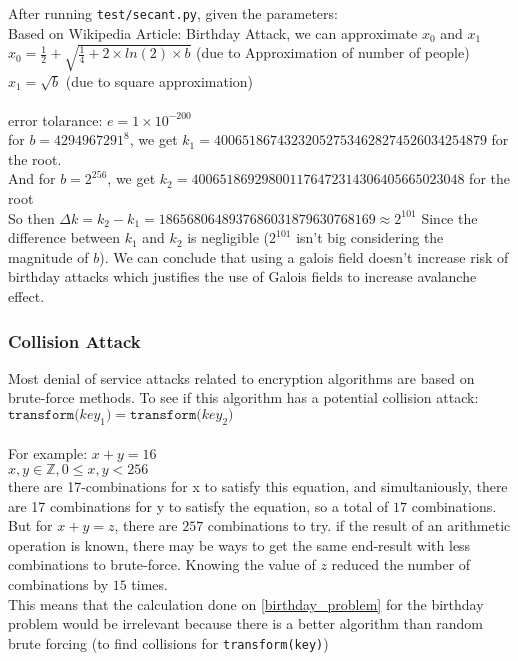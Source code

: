 \documentclass[fleqn, a4paper,12pt]{article}
\begin{document}
After running \texttt{test/secant.py}, given the parameters: \\
Based on Wikipedia Article: Birthday Attack, we can approximate $x_0$ and $x_1$ \\
$x_0 = \frac{1}{2}+\sqrt{\frac{1}{4}+2 \times ln(2) \times b}$ (due to Approximation of number of people) \\
$x_1 = \sqrt{b}$ (due to square approximation) \\
\\ error tolarance:
$e = 1 \times 10^{-200}$ \\
for $b=4294967291^8$,  we get $k_1 = 400651867432320527534628274526034254879$ for the root. \\
And for $b = 2^{256}$, we get $k_2 = 400651869298001176472314306405665023048$ for the root \\
So then $\Delta k = k_2 - k_1 = 1865680648937686031879630768169 \approx 2^{101}$
Since the difference between $k_1$ and $k_2$ is negligible ($2^{101}$ isn't big considering the magnitude of $b$). We can conclude  that using a galois field doesn't increase risk of birthday attacks which justifies the use of Galois fields to increase avalanche effect.


\subsubsection {Collision Attack}

Most denial of service attacks related to encryption algorithms are based on brute-force methods. To see if this algorithm has a potential collision attack: \\
$\texttt{transform(} key_1 \texttt{)} = \texttt{transform(} key_2 \texttt{)}$ \\
\\
For example: $x + y = 16$ \\

$ x,y \in \mathbb{Z}, 0 \leq x,y < 256$ \\
there are 17-combinations for x to satisfy this equation, and simultaniously, there are 17 combinations for y to satisfy the equation, so a total of $17$ combinations.
\\
But for $x + y = z$, there are $257$ combinations to try. if the result of an arithmetic operation is known, there may be ways to get the same end-result with less combinations to brute-force. Knowing the value of $z$ reduced the number of combinations by $15$ times.
\\
This means that the calculation done on \ref{birthday_problem} for the birthday problem would be irrelevant because there is a better algorithm than random brute forcing (to find collisions for \texttt{transform(key)})
\end{document}
